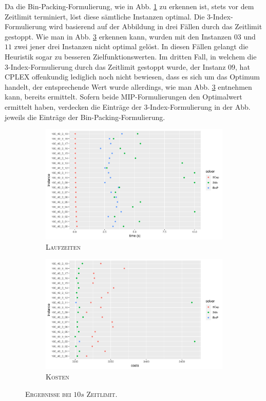 Da die Bin-Packing-Formulierung, wie in Abb. \ref{fig:b=3_s_runtimes} zu erkennen ist, stets vor dem Zeitlimit terminiert,
löst diese sämtliche Instanzen optimal. Die 3-Index-Formulierung wird basierend auf der Abbildung in drei Fällen
durch das Zeitlimit gestoppt. Wie man in Abb. \ref{fig:b=3_s_costs} erkennen kann, wurden mit den
Instanzen $03$ und $11$ zwei jener drei Instanzen nicht optimal gelöst.
In diesen Fällen gelangt die Heuristik sogar zu besseren Zielfunktionswerten.
Im dritten Fall, in welchem die 3-Index-Formulierung durch das Zeitlimit gestoppt wurde, der Instanz $09$, hat \textsc{CPLEX}
offenkundig lediglich noch nicht bewiesen, dass es sich um das Optimum handelt, der entsprechende Wert wurde allerdings,
wie man Abb. \ref{fig:b=3_s_costs} entnehmen kann, bereits ermittelt. Sofern beide MIP-Formulierungen den Optimalwert ermittelt haben,
verdecken die Einträge der 3-Index-Formulierung in der Abb. jeweils die Einträge der Bin-Packing-Formulierung.

\begin{figure}[H]
\centering
\begin{subfigure}[b]{0.4\textwidth}
\centering
\includegraphics[width=1.3\textwidth]{img/solver_instance_time_b=3_s_10s.png}
\caption{\textsc{Laufzeiten}}
\label{fig:b=3_s_runtimes}
\end{subfigure}
\hfill
\begin{subfigure}[b]{0.4\textwidth}
\centering
\includegraphics[width=1.3\textwidth]{img/solver_instance_cost_b=3_s_10s.png}
\caption{\textsc{Kosten}}
\label{fig:b=3_s_costs}
\end{subfigure}
\caption{\textsc{Ergebnisse bei $10s$ Zeitlimit}.}
\end{figure}

